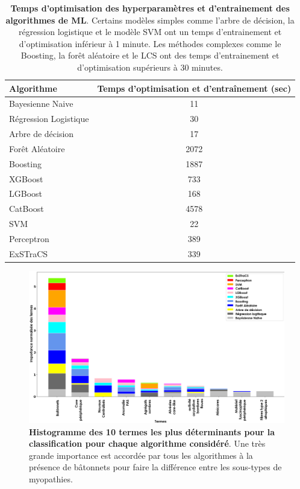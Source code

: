 \begin{table}[!htbp]
    \centering
    \begin{tabular}{lc}
        \toprule
        Algorithme & Temps d'optimisation et d'entraînement (sec) \\
        \midrule
        Bayesienne Naive & 11 \\
        Régression Logistique & 30 \\
        Arbre de décision & 17 \\
        Forêt Aléatoire & 2072 \\
        Boosting & 1887 \\
        XGBoost & 733 \\
        LGBoost & 168 \\
        CatBoost & 4578 \\
        SVM & 22 \\
        Perceptron & 389 \\
        ExSTraCS & 339 \\
        \bottomrule
    \end{tabular}
    \caption[Temps d'optimisation des hyperparamètres et d'entrainement des algorithmes de ML]{\textbf{Temps d'optimisation des hyperparamètres et d'entrainement des algorithmes de ML}. Certains modèles simples comme l'arbre de décision, la régression logistique et le modèle SVM ont un temps d'entrainement et d'optimisation inférieur à 1 minute. Les méthodes complexes comme le Boosting, la forêt aléatoire et le LCS ont des temps d'entrainement et d'optimisation supérieurs à 30 minutes.}
    \label{tab:pipeline_times}
\end{table}
\begin{figure}[!htbp]
  \centering
  \includegraphics[width=1\textwidth]{figures/feature_importance.png}
  \caption[Histogramme des 10 termes les plus déterminants pour la classification]{\textbf{Histogramme des 10 termes les plus déterminants pour la classification pour chaque algorithme considéré}. Une très grande importance est accordée par tous les algorithmes à la présence de bâtonnets pour faire la différence entre les sous-types de myopathies.}
  \label{fig:feautre_importance}
\end{figure}
